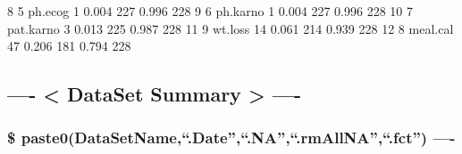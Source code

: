 \documentclass[
]{article}
\newenvironment{Shaded}{\begin{snugshade}}{\end{snugshade}}
\newcommand{\DecValTok}[1]{\textcolor[rgb]{0.00,0.00,0.81}{#1}}
\newcommand{\FloatTok}[1]{\textcolor[rgb]{0.00,0.00,0.81}{#1}}
\newcommand{\NormalTok}[1]{#1}
\begin{document}
\begin{Shaded}
\begin{Highlighting}[]
\DecValTok{8}       \DecValTok{5}\NormalTok{         ph.ecog    }\DecValTok{1}     \FloatTok{0.004}   \DecValTok{227}      \FloatTok{0.996}  \DecValTok{228}
\DecValTok{9}       \DecValTok{6}\NormalTok{        ph.karno    }\DecValTok{1}     \FloatTok{0.004}   \DecValTok{227}      \FloatTok{0.996}  \DecValTok{228}
\DecValTok{10}      \DecValTok{7}\NormalTok{       pat.karno    }\DecValTok{3}     \FloatTok{0.013}   \DecValTok{225}      \FloatTok{0.987}  \DecValTok{228}
\DecValTok{11}      \DecValTok{9}\NormalTok{         wt.loss   }\DecValTok{14}     \FloatTok{0.061}   \DecValTok{214}      \FloatTok{0.939}  \DecValTok{228}
\DecValTok{12}      \DecValTok{8}\NormalTok{        meal.cal   }\DecValTok{47}     \FloatTok{0.206}   \DecValTok{181}      \FloatTok{0.794}  \DecValTok{228}
\end{Highlighting}
\end{Shaded}

\hypertarget{dataset-summary--}{%
\subsection{---- \textless{} DataSet Summary \textgreater{}
----}\label{dataset-summary--}}

\hypertarget{paste0datasetname.date.na.rmallna.fct--}{%
\subsubsection{\$
paste0(DataSetName,``.Date'',``.NA'',``.rmAllNA'',``.fct'')
----}\label{paste0datasetname.date.na.rmallna.fct--}}
\end{document}
